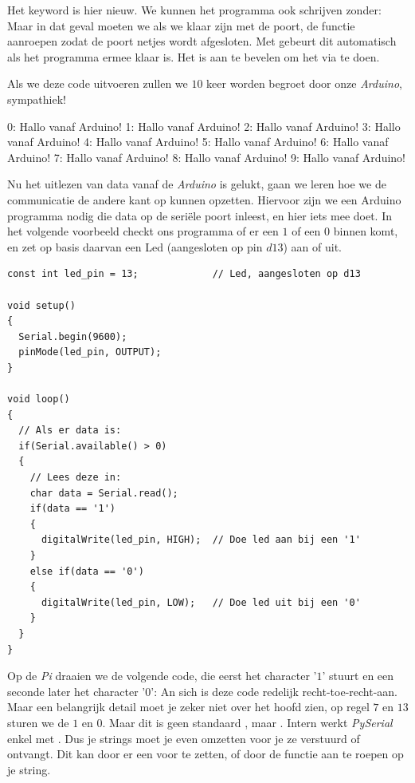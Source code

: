 Het keyword  is hier nieuw. We kunnen het programma ook schrijven zonder:
Maar in dat geval moeten we als we klaar zijn met de poort, de functie  aanroepen zodat de poort netjes wordt afgesloten. Met  gebeurt dit automatisch als het programma ermee klaar is. Het is aan te bevelen om het via  te doen. 

Als we deze code uitvoeren zullen we $10$ keer worden begroet door onze \textit{Arduino}, sympathiek!
\begin{python}
0: Hallo vanaf Arduino!
1: Hallo vanaf Arduino!
2: Hallo vanaf Arduino!
3: Hallo vanaf Arduino!
4: Hallo vanaf Arduino!
5: Hallo vanaf Arduino!
6: Hallo vanaf Arduino!
7: Hallo vanaf Arduino!
8: Hallo vanaf Arduino!
9: Hallo vanaf Arduino!
\end{python}


Nu het uitlezen van data vanaf de \textit{Arduino} is gelukt, gaan we leren hoe we de communicatie de andere kant op kunnen opzetten. Hiervoor zijn we een Arduino programma nodig die data op de seriële poort inleest, en hier iets mee doet. In het volgende voorbeeld checkt ons programma of er een $1$ of een $0$ binnen komt, en zet op basis daarvan een Led (aangesloten op pin $d13$) aan of uit. 

\newpage 

\begin{lstlisting}[language=Arduino]
const int led_pin = 13;             // Led, aangesloten op d13

void setup() 
{
  Serial.begin(9600);
  pinMode(led_pin, OUTPUT);
}

void loop() 
{
  // Als er data is:
  if(Serial.available() > 0)
  {
    // Lees deze in:
    char data = Serial.read();
    if(data == '1')
    {
      digitalWrite(led_pin, HIGH);  // Doe led aan bij een '1'
    }
    else if(data == '0')
    {
      digitalWrite(led_pin, LOW);   // Doe led uit bij een '0'
    }
  }
}
\end{lstlisting}

Op de \textit{Pi} draaien we de volgende code, die eerst het character '$1$' stuurt en een seconde later het character '$0$':
An sich is deze code redelijk recht-toe-recht-aan. Maar een belangrijk detail moet je zeker niet over het hoofd zien, op regel $7$ en $13$ sturen we de $1$ en $0$. Maar dit is geen standaard , maar . Intern werkt \textit{PySerial} enkel met . Dus je strings moet je even omzetten voor je ze verstuurd of ontvangt. Dit kan door er een  voor te zetten, of door de functie  aan te roepen op je string.

